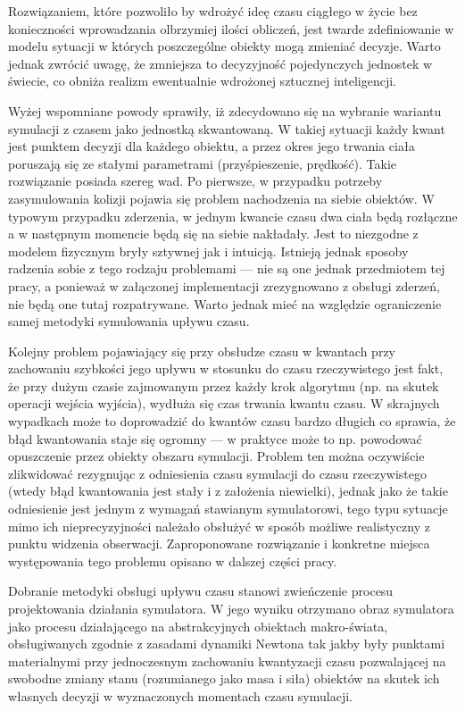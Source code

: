 {{}
\par{
Rozwiązaniem, które pozwoliło by wdrożyć ideę czasu ciągłego w życie bez konieczności wprowadzania olbrzymiej ilości obliczeń, jest twarde zdefiniowanie w modelu sytuacji w których poszczególne obiekty mogą zmieniać decyzje. Warto jednak zwrócić uwagę, że zmniejsza to decyzyjność pojedynczych jednostek w świecie, co obniża realizm ewentualnie wdrożonej sztucznej inteligencji.
}
\par{
Wyżej wspomniane powody sprawiły, iż zdecydowano się na wybranie wariantu symulacji z czasem jako jednostką skwantowaną. W takiej sytuacji każdy kwant jest punktem decyzji dla każdego obiektu, a przez okres jego trwania ciała poruszają się ze stałymi parametrami (przyśpieszenie, prędkość).
Takie rozwiązanie posiada szereg wad. Po pierwsze, w przypadku potrzeby zasymulowania kolizji pojawia się problem nachodzenia na siebie obiektów. W typowym przypadku zderzenia, w jednym kwancie czasu dwa ciała będą rozłączne a w następnym momencie będą się na siebie nakładały. Jest to niezgodne z modelem fizycznym bryły sztywnej jak i intuicją. Istnieją jednak sposoby radzenia sobie z tego rodzaju problemami --- nie są one jednak przedmiotem tej pracy, a ponieważ w załączonej implementacji zrezygnowano z obsługi zderzeń, nie będą one tutaj rozpatrywane. Warto jednak mieć na względzie ograniczenie samej metodyki symulowania upływu czasu.
}
\par{
Kolejny problem pojawiający się przy obsłudze czasu w kwantach przy zachowaniu szybkości jego upływu w stosunku do czasu rzeczywistego jest fakt, że przy dużym czasie zajmowanym przez każdy krok algorytmu (np. na skutek operacji wejścia wyjścia), wydłuża się czas trwania kwantu czasu. W skrajnych wypadkach może to doprowadzić do kwantów czasu bardzo długich co sprawia, że błąd kwantowania staje się ogromny --- w praktyce może to np. powodować opuszczenie przez obiekty obszaru symulacji.
Problem ten można oczywiście zlikwidować rezygnując z odniesienia czasu symulacji do czasu rzeczywistego (wtedy błąd kwantowania jest stały i z założenia niewielki), jednak jako że takie odniesienie jest jednym z wymagań stawianym symulatorowi, tego typu sytuacje mimo ich nieprecyzyjności należało obsłużyć w sposób możliwe realistyczny z punktu widzenia obserwacji. Zaproponowane rozwiązanie i konkretne miejsca występowania tego problemu opisano w dalszej części pracy.
}
\par{
Dobranie metodyki obsługi upływu czasu stanowi zwieńczenie procesu projektowania działania symulatora. W jego wyniku otrzymano obraz symulatora jako procesu działającego na abstrakcyjnych obiektach makro-świata, obsługiwanych zgodnie z zasadami dynamiki Newtona tak jakby były punktami materialnymi przy jednoczesnym zachowaniu kwantyzacji czasu pozwalającej na swobodne zmiany stanu (rozumianego jako masa i siła) obiektów na skutek ich własnych decyzji w wyznaczonych momentach czasu symulacji.
}

}
